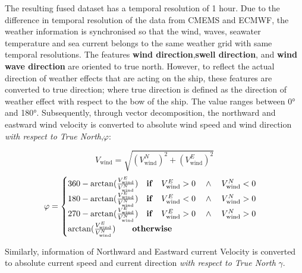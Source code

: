 The resulting fused dataset has a temporal resolution of 1 hour. Due to the difference in temporal resolution of the data from CMEMS and ECMWF, the weather information is synchronised so that the wind, waves, seawater temperature and sea current belongs to the same weather grid with same temporal resolutions. The features \textbf{wind direction},\textbf{swell direction}, and \textbf{wind wave direction} are oriented to true north. However, to reflect the actual direction of weather effects that are acting on the ship, these features are converted to true direction; where true direction is defined as the direction of weather effect with respect to the bow of the ship. The value ranges between 0° and 180°. Subsequently, through vector decomposition, the northward and eastward wind velocity is converted to absolute wind speed and wind direction \emph{with respect to True North},$\varphi$:

\begin{equation}\label{eqn:vwindabs}
    V_{\text{wind}} = \sqrt{(V_{\text{wind}}^N)^2 + (V_{\text{wind}}^E)^2} 
\end{equation}
\begin{equation}\label{eqn:winddir}
    \varphi = 
    \begin{cases}
        360 - \arctan(\frac{V_{\text{wind}}^E}{V_{\text{wind}}^N}) \quad \text{\textbf{if}} \quad V_{\text{wind}}^E > 0 \quad \wedge \quad V_{\text{wind}}^N < 0 \\ 
        180 - \arctan(\frac{V_{\text{wind}}^E}{V_{\text{wind}}^N}) \quad \text{\textbf{if}} \quad V_{\text{wind}}^E < 0 \quad \wedge \quad V_{\text{wind}}^N > 0 \\ 
        270 - \arctan(\frac{V_{\text{wind}}^E}{V_{\text{wind}}^N}) \quad \text{\textbf{if}} \quad V_{\text{wind}}^E > 0 \quad \wedge \quad V_{\text{wind}}^N > 0 \\
        \arctan(\frac{V_{\text{wind}}^E}{V_{\text{wind}}^N}) \qquad \text{\textbf{otherwise}} 
    \end{cases}   
\end{equation}

Similarly, information of Northward and Eastward current Velocity is converted to absolute current speed and current direction \emph{with respect to True North} $\gamma$.\\ 

